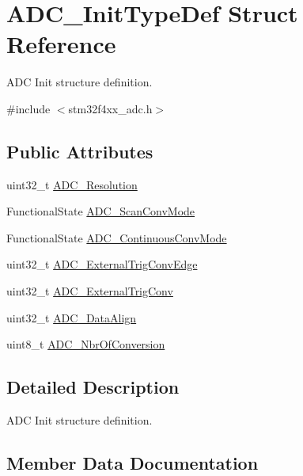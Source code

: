 \hypertarget{struct_a_d_c___init_type_def}{}\section{A\+D\+C\+\_\+\+Init\+Type\+Def Struct Reference}
\label{struct_a_d_c___init_type_def}


A\+DC Init structure definition.  




{\ttfamily \#include $<$stm32f4xx\+\_\+adc.\+h$>$}

\subsection*{Public Attributes}
\begin{DoxyCompactItemize}
\item 
uint32\+\_\+t \hyperlink{struct_a_d_c___init_type_def_a275d9553bbe17a60d618b619678b7c94}{A\+D\+C\+\_\+\+Resolution}
\item 
Functional\+State \hyperlink{struct_a_d_c___init_type_def_aaf44f54f22ab40bf8fae01f075aa4c87}{A\+D\+C\+\_\+\+Scan\+Conv\+Mode}
\item 
Functional\+State \hyperlink{struct_a_d_c___init_type_def_a2149036a332281e70a36879a2396b8d1}{A\+D\+C\+\_\+\+Continuous\+Conv\+Mode}
\item 
uint32\+\_\+t \hyperlink{struct_a_d_c___init_type_def_abe372c73942aef47016be85ca1b79650}{A\+D\+C\+\_\+\+External\+Trig\+Conv\+Edge}
\item 
uint32\+\_\+t \hyperlink{struct_a_d_c___init_type_def_ae5d0c48e70c2a39355b7ab0cc1df8310}{A\+D\+C\+\_\+\+External\+Trig\+Conv}
\item 
uint32\+\_\+t \hyperlink{struct_a_d_c___init_type_def_a622e89d8fba3900f20aaf40d5560ab7b}{A\+D\+C\+\_\+\+Data\+Align}
\item 
uint8\+\_\+t \hyperlink{struct_a_d_c___init_type_def_a4a508c4bed196dcd50ba03b49c78f460}{A\+D\+C\+\_\+\+Nbr\+Of\+Conversion}
\end{DoxyCompactItemize}


\subsection{Detailed Description}
A\+DC Init structure definition. 

\subsection{Member Data Documentation}
